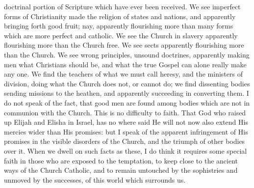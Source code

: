 doctrinal portion of Scripture which have ever been received. We see
imperfect forms of Christianity made the religion of states and
nations, and apparently bringing forth good fruit; nay, apparently
flourishing more than many forms which are more perfect and catholic.
We see the Church in slavery apparently flourishing more than the
Church free. We see sects apparently flourishing more than the Church.
We see wrong principles, unsound doctrines, apparently making men what
Christians should be, and what the true Gospel can alone really make
any one. We find the teachers of what we must call heresy, and the
ministers of division, doing what the Church does not, or cannot do;
we find dissenting bodies sending missions to the heathen, and
apparently succeeding in converting them. I do not speak of the fact,
that good men are found among bodies which are not in communion with
the Church. This is no difficulty to faith. That God who raised up
Elijah and Elisha in Israel, has no where said He will not now also
extend His mercies wider than His promises: but I speak of the
apparent infringement of His promises in the visible disorders of the
Church, and the triumph of other bodies over it. When we dwell on such
facts as these, I do think it requires some special faith in those who
are exposed to the temptation, to keep close to the ancient ways of
the Church Catholic, and to remain untouched by the sophistries and
unmoved by the successes, of this world which surrounds us.

